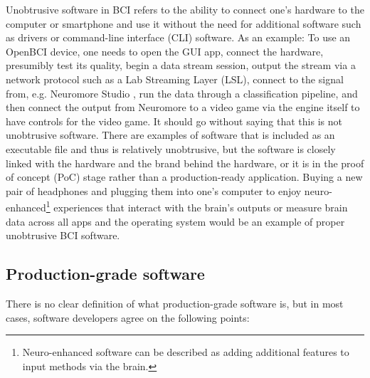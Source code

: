 Unobtrusive software in BCI refers to the ability to connect one's hardware to the computer or smartphone and use it without the need for additional software such as drivers or command-line interface (CLI) software. As an example: To use an OpenBCI device, one needs to open the GUI app, connect the hardware, presumibly test its quality, begin a data stream session, output the stream via a network protocol such as a Lab Streaming Layer (LSL), connect to the signal from, e.g. Neuromore Studio \citep{openbci_neuromore_nodate}, run the data through a classification pipeline, and then connect the output from Neuromore to a video game via the engine itself to have controls for the video game. It should go without saying that this is not unobtrusive software. There are examples of software that is included as an executable file and thus is relatively unobtrusive, but the software is closely linked with the hardware and the brand behind the hardware, or it is in the proof of concept (PoC) stage rather than a production-ready application. Buying a new pair of headphones and plugging them into one's computer to enjoy neuro-enhanced\footnote{Neuro-enhanced software can be described as adding additional features to input methods via the brain.} experiences that interact with the brain's outputs or measure brain data across all apps and the operating system would be an example of proper unobtrusive BCI software.

\subsection{Production-grade software}
\label{chapter2-production-grade-software}

There is no clear definition of what production-grade software is, but in most cases, software developers agree on the following points:

